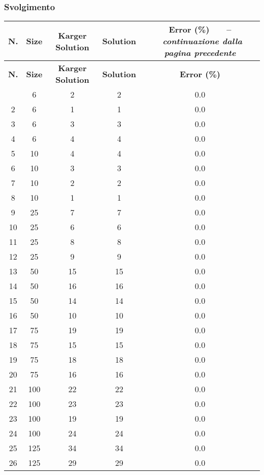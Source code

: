 \subsubsection{Svolgimento}

\begin{center}
	\begin{longtable}{|c|c|c|c|c|}	
		\hline
		\textbf{N.} & \textbf{Size} & \textbf{Karger Solution} & \textbf{Solution} & \textbf{Error (\%)}
		\endfirsthead
		{\tablename\ \thetable\ \ --\  \textit{continuazione dalla pagina precedente}} \\
		\hline
		\textbf{N.} & \textbf{Size} & \textbf{Karger Solution} & \textbf{Solution} & \textbf{Error (\%)}
		\endhead
		\hline {\textit{Continua nella pagina seguente}} \\
		\endfoot  
		\endlastfoot
		\hline
		1 & 6 & 2 & 2 & 0.0 \\
		2 & 6 & 1 & 1 & 0.0 \\
		3 & 6 & 3 & 3 & 0.0 \\
		4 & 6 & 4 & 4 & 0.0 \\
		5 & 10 & 4 & 4 & 0.0 \\
		6 & 10 & 3 & 3 & 0.0 \\
		7 & 10 & 2 & 2 & 0.0 \\
		8 & 10 & 1 & 1 & 0.0 \\
		9 & 25 & 7 & 7 & 0.0 \\
		10 & 25 & 6 & 6 & 0.0 \\
		11 & 25 & 8 & 8 & 0.0 \\
		12 & 25 & 9 & 9 & 0.0 \\
		13 & 50 & 15 & 15 & 0.0 \\
		14 & 50 & 16 & 16 & 0.0 \\
		15 & 50 & 14 & 14 & 0.0 \\
		16 & 50 & 10 & 10 & 0.0 \\
		17 & 75 & 19 & 19 & 0.0 \\
		18 & 75 & 15 & 15 & 0.0 \\
		19 & 75 & 18 & 18 & 0.0 \\
		20 & 75 & 16 & 16 & 0.0 \\
		21 & 100 & 22 & 22 & 0.0 \\
		22 & 100 & 23 & 23 & 0.0 \\
		23 & 100 & 19 & 19 & 0.0 \\
		24 & 100 & 24 & 24 & 0.0 \\
		25 & 125 & 34 & 34 & 0.0 \\
		26 & 125 & 29 & 29 & 0.0 \\

\end{longtable}
\end{center}
